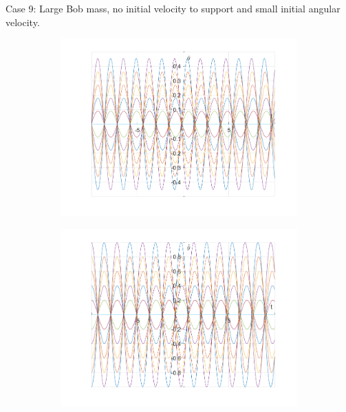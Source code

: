 \documentclass{article}
\begin{document}
	Case 9:
	Large Bob mass, no initial velocity to support and small initial angular velocity.
			\begin{figure}[h!]
		\centering
		\begin{subfigure}[b]{0.48\linewidth}
			\includegraphics[width=\linewidth]{./SmallOscillations/S9/F1.png}
		\end{subfigure}
		\begin{subfigure}[b]{0.48\linewidth}
			\includegraphics[width=\linewidth]{./SmallOscillations/S9/F2.png}
		\end{subfigure}
	\end{figure}
\end{document}
